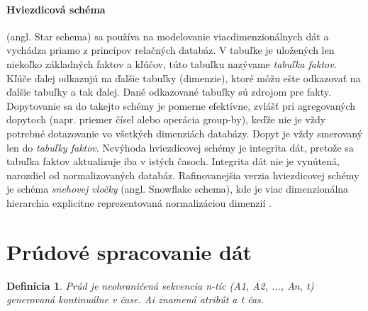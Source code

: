\paragraph{Hviezdicová schéma} (angl. Star schema) sa používa na modelovanie viacdimenzionálnych dát a vychádza priamo z princípov relačných databáz. V tabuľke je uložených len niekoľko základných faktov a kľúčov, túto tabuľku nazývame \textit{tabuľka faktov}. Kľúče ďalej odkazujú na ďalšie tabuľky (dimenzie), ktoré môžu ešte odkazovať na ďalšie tabuľky \citep{chaudhuri1997overview} a tak ďalej. Dané odkazované tabuľky sú zdrojom pre fakty. 
Dopytovanie sa do takejto schémy je pomerne efektívne, zvlášť pri agregovaných dopytoch (napr. priemer čísel alebo operácia group-by), keďže nie je vždy potrebné dotazovanie vo všetkých dimenziách databázy. 
Dopyt je vždy smerovaný len do \textit{tabuľky faktov}. 
Nevýhoda hviezdicovej schémy je integrita dát, pretože sa tabuľka faktov aktualizuje iba v istých časoch. Integrita dát nie je vynútená, narozdiel od normalizovaných databáz. 
Rafinovanejšia verzia hviezdicovej schémy je schéma \textit{snehovej vločky} (angl. Snowflake schema), kde je viac dimenzionálna hierarchia explicitne reprezentovaná normalizáciou dimenzií \citep{chaudhuri1997overview}.






\section{Prúdové spracovanie dát}
\label{prudove-spracovanie-dat}
\newtheorem{mydef}{Definícia}[section]
\begin{mydef}
	Prúd je neohraničená sekvencia n-tíc (A1, A2, ..., An, t) generovaná kontinuálne v čase. \textit{Ai} znamená atribút a \textit{t} čas.
\end{mydef}

